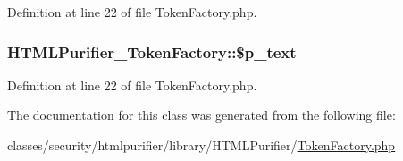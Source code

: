 Definition at line 22 of file Token\+Factory.\+php.

\hypertarget{classHTMLPurifier__TokenFactory_a44d3335320c4d44bb0a9b2af2df70bcb}{
\subsubsection[{\$p\+\_\+text}]{\setlength{\rightskip}{0pt plus 5cm}H\+T\+M\+L\+Purifier\+\_\+\+Token\+Factory\+::\$p\+\_\+text}}\label{classHTMLPurifier__TokenFactory_a44d3335320c4d44bb0a9b2af2df70bcb}


Definition at line 22 of file Token\+Factory.\+php.



The documentation for this class was generated from the following file\+:\begin{DoxyCompactItemize}
\item 
classes/security/htmlpurifier/library/\+H\+T\+M\+L\+Purifier/\hyperlink{TokenFactory_8php}{Token\+Factory.\+php}\end{DoxyCompactItemize}
